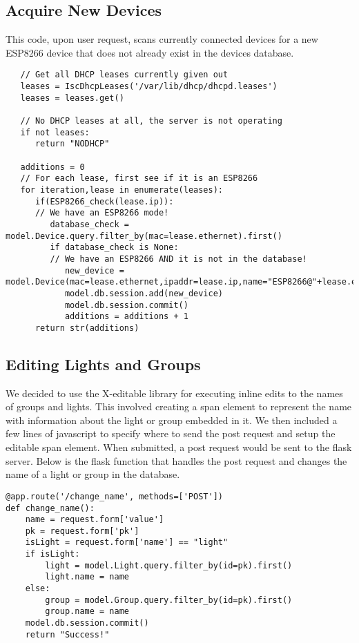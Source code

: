 \documentclass[oneside,openright]{book}
\begin{document}
\subsection{Acquire New Devices}
This code, upon user request, scans currently connected devices for a new ESP8266 device that does not already exist in the devices database.
\begin{lstlisting}
   // Get all DHCP leases currently given out
   leases = IscDhcpLeases('/var/lib/dhcp/dhcpd.leases')
   leases = leases.get()

   // No DHCP leases at all, the server is not operating
   if not leases:
      return "NODHCP"

   additions = 0
   // For each lease, first see if it is an ESP8266
   for iteration,lease in enumerate(leases):
      if(ESP8266_check(lease.ip)):
      // We have an ESP8266 mode!
         database_check = model.Device.query.filter_by(mac=lease.ethernet).first()
         if database_check is None:
         // We have an ESP8266 AND it is not in the database!
            new_device = model.Device(mac=lease.ethernet,ipaddr=lease.ip,name="ESP8266@"+lease.ethernet)
            model.db.session.add(new_device)
            model.db.session.commit()
            additions = additions + 1
      return str(additions)
   \end{lstlisting}
\subsection{Editing Lights and Groups}
We decided to use the X-editable library for executing inline edits to the names of groups and lights. This involved creating a span element to represent the name with information about the light or group embedded in it. We then included a few lines of javascript to specify where to send the post request and setup the editable span element. When submitted, a post request would be sent to the flask server. Below is the flask function that handles the post request and changes the name of a light or group in the database.
\begin{lstlisting}
@app.route('/change_name', methods=['POST'])
def change_name():
    name = request.form['value']
    pk = request.form['pk']
    isLight = request.form['name'] == "light"
    if isLight:
        light = model.Light.query.filter_by(id=pk).first()
        light.name = name
    else:
        group = model.Group.query.filter_by(id=pk).first()
        group.name = name
    model.db.session.commit()
    return "Success!"
\end{lstlisting}
\end{document}
